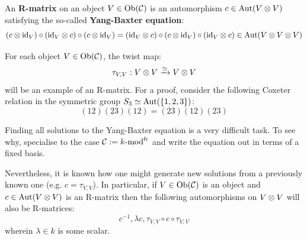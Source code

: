         \begin{definition}[R-matrices] \label{def: R_matrices}
            An \textbf{R-matrix} on an object $V \in \mathrm{Ob}(\mathcal{C})$ is an automorphism $c \in \Aut(V \tensor V)$ satisfying the so-called \textbf{Yang-Baxter equation}:
                $$(c \tensor \id_V) \circ (\id_V \tensor c) \circ (c \tensor \id_V) = (\id_V \tensor c) \circ (c \tensor \id_V) \circ (\id_V \tensor c) \in \Aut(V \tensor V \tensor V)$$
        \end{definition}
        \begin{example}
            For each object $V \in \mathrm{Ob}(\mathcal{C})$, the twist map:
                $$\tau_{V, V}: V \tensor V \xrightarrow[]{\cong} V \tensor V$$
            will be an example of an R-matrix. For a proof, consider the following Coxeter relation in the symmetric group $S_3 \simeq \operatorname{Aut}(\{1, 2, 3\})$:
                $$(12)(23)(12) = (23)(12)(23)$$    
        \end{example}
        \begin{remark}
            Finding all solutions to the Yang-Baxter equation is a very difficult task. To see why, specialise to the case $\mathcal{C} := k\text{-}\mathrm{mod}^{\mathrm{fr}}$ and write the equation out in terms of a fixed basis. 
            
            Nevertheless, it is known how one might generate new solutions from a previously known one (e.g. $c = \tau_{V, V}$). In particular, if $V \in \mathrm{Ob}(\mathcal{C})$ is an object and $c \in \Aut(V \tensor V)$ is an R-matrix then the following automorphisms on $V \tensor V$ will also be R-matrices:
                $$c^{-1}, \lambda c, \tau_{V, V} \circ c \circ \tau_{V, V}$$
            wherein $\lambda \in k$ is some scalar.
        \end{remark}
